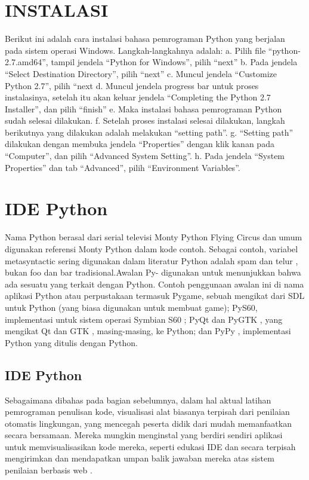 \section{INSTALASI}
Berikut ini adalah cara instalasi bahasa pemrograman Python yang berjalan pada sistem operasi Windows. Langkah-langkahnya adalah: 
a. Pilih file “python-2.7.amd64”, tampil jendela “Python for Windows”, pilih “next” 
b. Pada jendela “Select Destination Directory”, pilih “next”
 c. Muncul jendela “Customize Python 2.7”, pilih “next
 d. Muncul jendela progress bar untuk proses instalasinya, setelah itu akan keluar jendela “Completing the Python 2.7 Installer”, dan pilih “finish” 
 e. Maka instalasi bahasa pemrograman Python sudah selesai dilakukan. 
 f. Setelah proses instalasi selesai dilakukan, langkah berikutnya yang dilakukan adalah melakukan “setting path”. 
 g. “Setting path” dilakukan dengan membuka jendela “Properties” dengan klik kanan pada “Computer”, dan pilih “Advanced System Setting”. 
 h. Pada jendela “System Properties” dan tab “Advanced”, pilih “Environment Variables”\cite{wicaksana2013user}.

\section{IDE Python}
Nama Python berasal dari serial televisi Monty Python Flying Circus dan umum digunakan referensi Monty Python dalam kode contoh. Sebagai contoh, variabel metasyntactic sering digunakan dalam literatur Python adalah spam dan telur , bukan foo dan bar tradisional.Awalan Py- digunakan untuk menunjukkan bahwa ada sesuatu yang terkait dengan Python. Contoh penggunaan awalan ini di nama aplikasi Python atau perpustakaan termasuk Pygame, sebuah mengikat dari SDL untuk Python (yang biasa digunakan untuk membuat game); PyS60, implementasi untuk sistem operasi Symbian S60 ; PyQt dan PyGTK , yang mengikat Qt dan GTK , masing-masing, ke Python; dan PyPy , implementasi Python yang ditulis dengan Python. \cite{van2007python}

\subsection{IDE Python}
Sebagaimana dibahas pada bagian sebelumnya, dalam hal aktual latihan pemrograman penulisan kode, visualisasi alat biasanya terpisah dari penilaian otomatis lingkungan, yang mencegah peserta didik dari mudah memanfaatkan secara bersamaan. Mereka mungkin menginstal yang berdiri sendiri aplikasi untuk memvisualisasikan kode mereka, seperti edukasi IDE dan secara terpisah mengirimkan dan mendapatkan umpan balik jawaban mereka atas sistem penilaian berbasis web \cite{helminen2010jype}.

